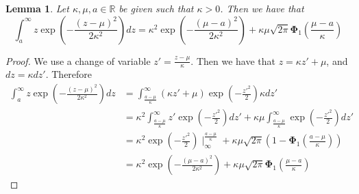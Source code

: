 \documentclass[10pt]{article} %
\newtheorem{lemma}[theorem]{Lemma}
\theoremstyle{definition}
\theoremstyle{plain}
\newcommand{\paren}[1]{\left(#1\right)}
\providecommand{\R}{\mathbb{R}}
\begin{document}
\begin{lemma}
    \label{lem:first_order_gaus_int}
    Let $\kappa, \mu, a\in\R$ be given such that $\kappa > 0$. Then we have that
    \[
        \int_{a}^\infty z\exp\paren{-\frac{\paren{z-\mu}^2}{2\kappa^2}}dz = \kappa^2\exp\paren{-\frac{\paren{\mu - a}^2}{2\kappa^2}} + \kappa\mu\sqrt{2\pi}\bm{\Phi}_1\paren{\frac{\mu-a}{\kappa}}
    \]
\end{lemma}
\begin{proof}
    We use a change of variable $z' = \frac{z - \mu}{\kappa}$. Then we have that $z = \kappa z' + \mu$, and $dz = \kappa dz'$. Therefore
    \begin{align*}
        \int_{a}^\infty z\exp\paren{-\frac{\paren{z-\mu}^2}{2\kappa^2}}dz & = \int_{\frac{a - \mu}{\kappa}}^\infty \paren{\kappa z' +\mu}\exp\paren{-\frac{z'^2}{2}}\kappa dz'\\
        & = \kappa^2\int_{\frac{a - \mu}{\kappa}}^\infty z'\exp\paren{-\frac{z'^2}{2}}dz' + \kappa\mu\int_{\frac{a - \mu}{\kappa}}^\infty\exp\paren{-\frac{z'^2}{2}}dz'\\
        & = \kappa^2\exp\paren{-\frac{z'^2}{2}}\mid _{\infty}^{\frac{a-\mu}{\kappa}} + \kappa\mu\sqrt{2\pi}\paren{1-\bm{\Phi}_1\paren{\frac{a-\mu}{\kappa}}}\\
        & = \kappa^2\exp\paren{-\frac{\paren{\mu - a}^2}{2\kappa^2}} + \kappa\mu\sqrt{2\pi}\bm{\Phi}_1\paren{\frac{\mu-a}{\kappa}}
    \end{align*}
\end{proof}
\end{document}
